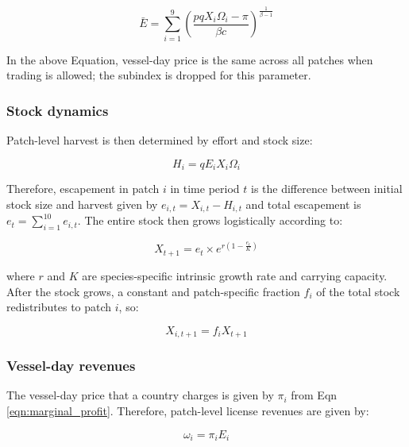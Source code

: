 \documentclass[12pt]{article}
\begin{document}
\begin{equation}
\bar{E} = \sum_{i = 1}^9\left(\frac{pqX_i\Omega_i - \pi}{\beta c }\right) ^ {\frac{1}{\beta - 1}}
\label{eqn:Ebar}
\end{equation}

\noindent In the above Equation, vessel-day price is the same across all patches when trading is allowed; the subindex is dropped for this parameter.

\subsubsection{Stock dynamics}

Patch-level harvest is then determined by effort and stock size:

\begin{equation}
H_i = qE_iX_i\Omega_i
\label{eqn:harvest}
\end{equation}


\noindent Therefore, escapement in patch $i$ in time period $t$ is the difference between initial stock size and harvest given by $e_{i,t} = X_{i,t} - H_{i,t}$ and total escapement is $e_t=\sum_{i=1}^{10}e_{i,t}$. The entire stock then grows logistically according to:

\begin{equation}
X_{t+1} = e_t \times  e^{r \left(1 - \frac{e_t}{K} \right)}
\label{eqn:grow}
\end{equation}

\noindent where $r$ and $K$ are species-specific intrinsic growth rate and carrying capacity. After the stock grows, a constant and patch-specific fraction $f_i$ of the total stock redistributes to patch $i$, so:

\begin{equation}
X_{i,t+1} = f_iX_{t+1}
\label{eqn:disperse}
\end{equation}

\subsubsection{Vessel-day revenues}

The vessel-day price that a country charges is given by $\pi_i$ from Eqn \ref{eqn:marginal_profit}. Therefore, patch-level license revenues are given by:

\begin{equation}
\omega_i = \pi_iE_i
\label{eqn:license_revenue}
\end{equation}
\end{document}
